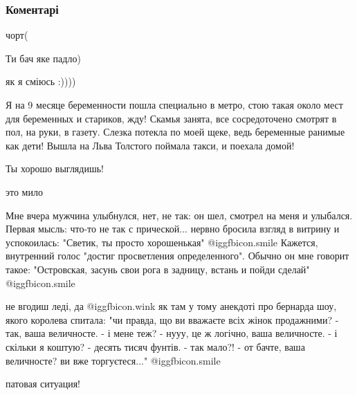  
 
 
 
 
\subsubsection{Коментарі}
\label{sec:27_10_2021.fb.dragina_miriam.1.muzhschina_metro.cmt}

\begin{itemize} %
чорт(

Ти бач яке падло)

як я сміюсь :))))


Я на 9 месяце беременности пошла специально в метро, стою такая около мест для
беременных и стариков, жду! Скамья занята, все сосредоточено смотрят в пол, на
руки, в газету. Слезка потекла по моей щеке, ведь беременные ранимые как дети!
Вышла на Льва Толстого поймала такси, и поехала домой!


Ты хорошо выглядишь!

это мило


Мне вчера мужчина улыбнулся, нет, не так: он шел, смотрел на меня и улыбался.
Первая мысль: что-то не так с прической... нервно бросила взгляд в витрину и
успокоилась: "Светик, ты просто хорошенькая" @igg{fbicon.smile}  Кажется, внутренний голос
"достиг просветления определенного". Обычно он мне говорит такое: "Островская,
засунь свои рога в задницу, встань и пойди сделай" @igg{fbicon.smile} 


не вгодиш леді, да  @igg{fbicon.wink}  як там у тому анекдоті про бернарда шоу, якого королева
спитала: "чи правда, що ви вважаєте всіх жінок продажними? - так, ваша
величносте. - і мене теж? - нууу, це ж логічно, ваша величносте. - і скільки я
коштую? - десять тисяч фунтів. - так мало?! - от бачте, ваша величносте? ви вже
торгуєтеся..."  @igg{fbicon.smile} 

патовая ситуация!


\end{itemize}
